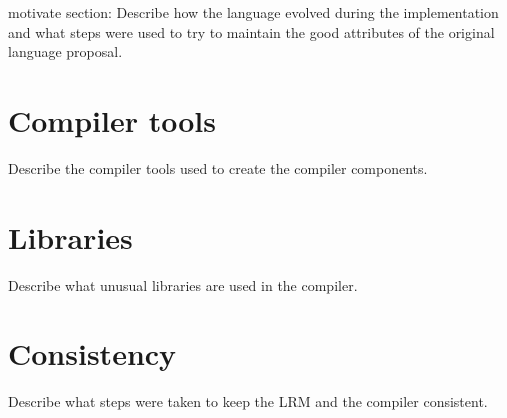 motivate section:
Describe how the language evolved during the implementation and what steps
were used to try to maintain the good attributes of the original language proposal.

\section{Compiler tools}
Describe the compiler tools used to create the compiler components.

\section{Libraries}
Describe what unusual libraries are used in the compiler.

\section{Consistency}
Describe what steps were taken to keep the LRM and the compiler consistent.









